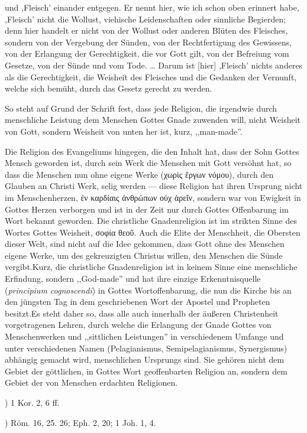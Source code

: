 \par\noindent und ,Fleisch' einander entgegen. Er nennt hier, wie ich schon oben erinnert habe, ,Fleisch' nicht die Wollust, viehische Leidenschaften oder sinnliche Begierden; denn hier handelt er nicht von der Wollust oder anderen Blüten des Fleisches, sondern von der Vergebung der Sünden, von der Rechtfertigung des Gewissens, von der Erlangung der Gerechtigkeit, die vor Gott gilt, von der Befreiung vom Gesetze, von der Sünde und vom Tode. \dots{} Darum ist [hier] ,Fleisch' nichts anderes als die Gerechtigkeit, die Weisheit des Fleisches und die Gedanken der Vernunft, welche sich bemüht, durch das Gesetz gerecht zu werden.\par So steht auf Grund der Schrift fest, dass jede Religion, die irgendwie durch menschliche Leistung dem Menschen Gottes Gnade zuwenden will, nicht Weisheit von Gott, sondern Weisheit von unten her ist, kurz, ,,man-made''.\par Die Religion des Evangeliums hingegen, die den Inhalt hat, dass der Sohn Gottes Mensch geworden ist, durch sein Werk die Menschen mit Gott versöhnt hat, so dass die Menschen nun ohne eigene Werke (\textgreek{χωρὶς ἔργων νόμου}), durch den Glauben an Christi Werk, selig werden --- diese Religion hat ihren Ursprung nicht im Menschenherzen, \textgreek{ἐν καρδίαις ἀνθρώπων οὐχ ἀρεῖν}, sondern war von Ewigkeit in Gottes Herzen verborgen und ist in der Zeit nur durch Gottes Offenbarung im Wort bekannt geworden. Die christliche Gnadenreligion ist im strikten Sinne des Wortes Gottes Weisheit, \textgreek{σοφία θεοῦ}. Auch die Elite der Menschheit, die Obersten dieser Welt, sind nicht auf die Idee gekommen, dass Gott ohne des Menschen eigene Werke, um des gekreuzigten Christus willen, den Menschen die Sünde vergibt.\footnotemark[69] Kurz, die christliche Gnadenreligion ist in keinem Sinne eine menschliche Erfindung, sondern ,,God-made'' und hat ihre einzige Erkenntnisquelle (\emph{principium cognoscendi}) in Gottes Wortoffenbarung, die nun die Kirche bis an den jüngsten Tag in dem geschriebenen Wort der Apostel und Propheten besitzt.\footnotemark[70] Es steht daher so, dass alle auch innerhalb der äußeren Christenheit vorgetragenen Lehren, durch welche die Erlangung der Gnade Gottes von Menschenwerken und ,,sittlichen Leistungen'' in verschiedenem Umfange und unter verschiedenen Namen (Pelagianismus, Semipelagianismus, Synergismus) abhängig gemacht wird, menschlichen Ursprungs sind. Sie gehören nicht dem Gebiet der göttlichen, in Gottes Wort geoffenbarten Religion an, sondern dem Gebiet der von Menschen erdachten Religionen.\par\vspace{0.5\baselineskip}\small{}) 1 Kor. 2, 6 ff.\par{}) Röm. 16, 25. 26; Eph. 2, 20; 1 Joh. 1, 4.
